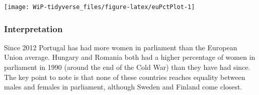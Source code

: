 \documentclass[a4paper,9pt,twocolumn,twoside,printwatermark=false]{pinp}
\begin{document}
\begin{Shaded}
\end{Shaded}

\begin{center}\texttt{[image: WiP-tidyverse\_files/figure-latex/euPctPlot-1]} \end{center}

\subsubsection{Interpretation}\label{interpretation-1}

Since 2012 Portugal has had more women in parliament than the European
Union average. Hungary and Romania both had a higher percentage of women
in parliament in 1990 (around the end of the Cold War) than they have
had since. The key point to note is that none of these countries reaches
equality between males and females in parliament, although Sweden and
Finland come closest.
\end{document}
